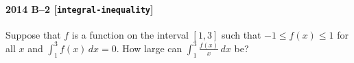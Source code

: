 \paragraph{2014 B--2 \textnormal{[\texttt{integral-inequality}]}}
Suppose that $f$ is a function on the interval $[1,3]$ such that $-1 \leq f(x) \leq 1$ for all $x$ and $\int_1^3 f(x)\,dx = 0$. How large can $\int_1^3 \frac{f(x)}{x}\,dx$ be?
